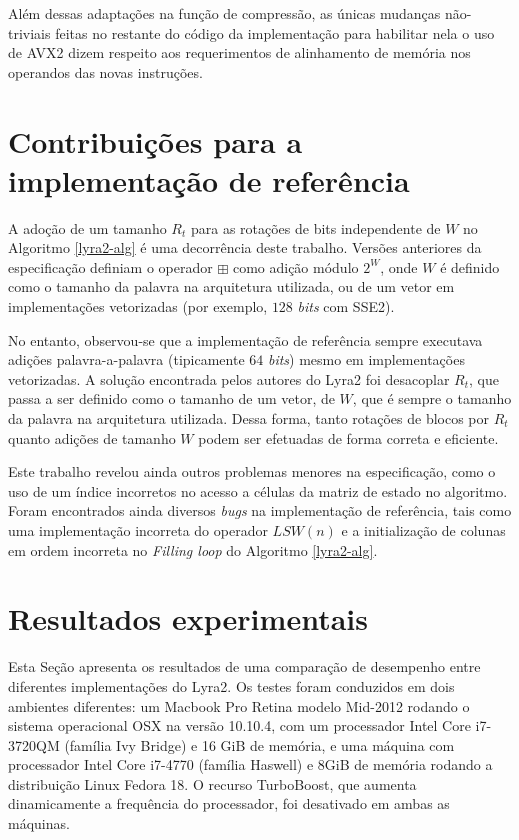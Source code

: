 \documentclass{article}
\begin{document}
Além dessas adaptações na função de compressão, as únicas mudanças
não-triviais feitas no restante do código da implementação para
habilitar nela o uso de AVX2 dizem respeito aos requerimentos de
alinhamento de memória nos operandos das novas instruções.

\section{Contribuições para a implementação de referência }
\label{sec-contribuicoes}

A adoção de um tamanho $R_{t}$ para as rotações de bits independente de $W$ no
Algoritmo \ref{lyra2-alg} é uma decorrência deste trabalho. Versões anteriores
da especificação definiam o operador $\boxplus$ como adição módulo $2^{W}$,
onde $W$ é definido como o tamanho da palavra na arquitetura utilizada, ou de
um vetor em implementações vetorizadas (por exemplo, $128$ \emph{bits} com SSE2).

No entanto, observou-se que a implementação de referência sempre executava
adições palavra-a-palavra (tipicamente $64$ \emph{bits}) mesmo em
implementações vetorizadas. A solução encontrada pelos autores do Lyra2 foi
desacoplar $R_{t}$, que passa a ser definido como o tamanho de um vetor, de
$W$, que é sempre o tamanho da palavra na arquitetura utilizada. Dessa forma,
tanto rotações de blocos por $R_{t}$ quanto adições de tamanho $W$ podem ser
efetuadas de forma correta e eficiente.

Este trabalho revelou ainda outros problemas menores na especificação, como o
uso de um índice incorretos no acesso a células da matriz de estado no
algoritmo. Foram encontrados ainda diversos \emph{bugs} na implementação de
referência, tais como uma implementação incorreta do operador $LSW(n)$ e a
initialização de colunas em ordem incorreta no \emph{Filling loop} do Algoritmo
\ref{lyra2-alg}.

\section{Resultados experimentais }
\label{sec-experimental}

Esta Seção apresenta os resultados de uma comparação de desempenho entre
diferentes implementações do Lyra2. Os testes foram conduzidos em
dois ambientes diferentes: um Macbook Pro Retina modelo Mid-2012 rodando
o sistema operacional OSX na versão 10.10.4, com um processador Intel
Core i7-3720QM (família Ivy Bridge) e 16 GiB de memória, e uma máquina
com processador Intel Core i7-4770 (família Haswell) e 8GiB de memória
rodando a distribuição Linux Fedora 18. O recurso TurboBoost, que
aumenta dinamicamente a frequência do processador, foi desativado em
ambas as máquinas.
\end{document}
